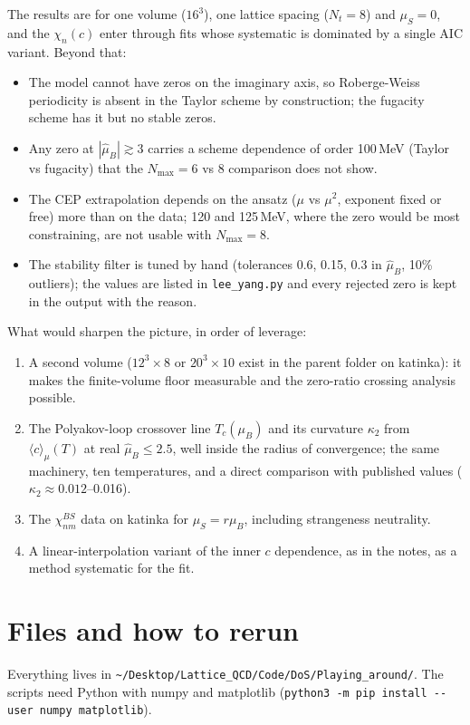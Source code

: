 \documentclass[11pt,a4paper]{article}
\newcommand{\muB}{\mu_B}
\newcommand{\hmu}{\hat{\mu}_B}
\newcommand{\Nmax}{N_{\max}}
\newcommand{\code}[1]{\texttt{#1}}
\begin{document}
The results are for one volume ($16^3$), one lattice spacing ($N_t=8$) and $\mu_S=0$, and the $\chi_n(c)$ enter through fits whose systematic is dominated by a single AIC variant. Beyond that:
\begin{itemize}[nosep]
\item The model cannot have zeros on the imaginary axis, so Roberge-Weiss periodicity is absent in the Taylor scheme by construction; the fugacity scheme has it but no stable zeros.
\item Any zero at $|\hmu|\gtrsim3$ carries a scheme dependence of order 100\,MeV (Taylor vs fugacity) that the $\Nmax=6$ vs 8 comparison does not show.
\item The CEP extrapolation depends on the ansatz ($\mu$ vs $\mu^2$, exponent fixed or free) more than on the data; 120 and 125\,MeV, where the zero would be most constraining, are not usable with $\Nmax=8$.
\item The stability filter is tuned by hand (tolerances 0.6, 0.15, 0.3 in $\hmu$, 10\% outliers); the values are listed in \code{lee\_yang.py} and every rejected zero is kept in the output with the reason.
\end{itemize}

What would sharpen the picture, in order of leverage:
\begin{enumerate}[nosep]
\item A second volume ($12^3\times8$ or $20^3\times10$ exist in the parent folder on katinka): it makes the finite-volume floor measurable and the zero-ratio crossing analysis possible.
\item The Polyakov-loop crossover line $T_c(\muB)$ and its curvature $\kappa_2$ from $\langle c\rangle_\mu(T)$ at real $\hmu\le2.5$, well inside the radius of convergence; the same machinery, ten temperatures, and a direct comparison with published values ($\kappa_2\approx0.012$--0.016).
\item The $\chi^{BS}_{nm}$ data on katinka for $\mu_S=r\muB$, including strangeness neutrality.
\item A linear-interpolation variant of the inner $c$ dependence, as in the notes, as a method systematic for the fit.
\end{enumerate}

\section{Files and how to rerun}

Everything lives in \code{\~{}/Desktop/Lattice\_QCD/Code/DoS/Playing\_around/}. The scripts need Python with numpy and matplotlib (\code{python3 -m pip install -{}-user numpy matplotlib}).
\end{document}
